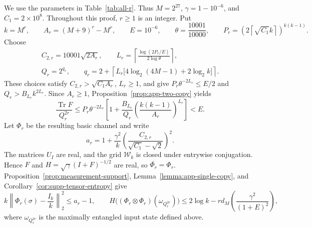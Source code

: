 We use the parameters in Table~\ref{tab:all-r}. Thus
$M=2^{27}$, $\gamma=1-10^{-6}$, and $C_1=2\times10^8$.
Throughout this proof, $r\ge1$ is an integer. Put
\[
 k=M^r,\qquad A_r=(M+9)^r-M^r,\qquad
 E=10^{-6},\qquad \theta=\frac{10001}{10000},\qquad
 P_r=\left(2\left\lceil\sqrt{C_1}k\right\rceil\right)^{k(k-1)}.
\]
Choose
\begin{equation}\label{eq:q-choice}
 \begin{gathered}
 C_{2,r}=10001\sqrt{2A_r},\qquad
 L_r=\left\lceil\frac{\log(2P_r/E)}{2\log\theta}\right\rceil,\\
 Q_r=2^{q_r},\qquad
 q_r=2+\left\lceil L_r\bigl[4\log_2(4M-1)+2\log_2 k\bigr]\right\rceil.
 \end{gathered}
\end{equation}
These choices satisfy $C_{2,r}>\sqrt{C_1A_r}$, $L_r\ge1$,
and give $P_r\theta^{-2L_r}\le E/2$ and
$Q_r>B_{L_r}k^{2L_r}$. Since $A_r\ge1$, Proposition~\ref{prop:app-two-copy} yields
\begin{equation}\label{eq:main-filter-bound}
 \frac{\operatorname{Tr}F}{Q_r^{2r}}
 \le P_r\theta^{-2L_r}
 \left[1+\frac{B_{L_r}}{Q_r}
 \left(\frac{k(k-1)}{A_r}\right)^{L_r}\right]<E.
\end{equation}
Let $\Phi_r$ be the resulting basic channel and write
\begin{equation}\label{eq:main-a}
 a_r=1+\frac{\gamma^2}{k}
 \left(\frac{C_{2,r}}{\sqrt{C_1}-\sqrt2}\right)^2.
\end{equation}
The matrices $U_I$ are real, and the grid $\mathcal W_k$ is closed
under entrywise conjugation. Hence $F$ and $H=\sqrt{\gamma}(I+F)^{-1/2}$ are real, so $\overline{\Phi_r}=\Phi_r$.
Proposition~\ref{prop:measurement-support}, Lemma~\ref{lemma:app-single-copy}, and Corollary~\ref{cor:supp-tensor-entropy} give
\begin{equation}\label{eq:main-basic-bounds}
 k\left\|\Phi_r(\sigma)-\frac{I_k}{k}\right\|_2^2\le a_r-1,
 \qquad
 H\bigl((\Phi_r\otimes\Phi_r)(\omega_{Q_r^{2r}})\bigr)
 \le 2\log k-rd_M\!\left(\frac{\gamma^2}{(1+E)^2}\right),
\end{equation}
where $\omega_{Q_r^{2r}}$ is the maximally entangled input state defined above.

